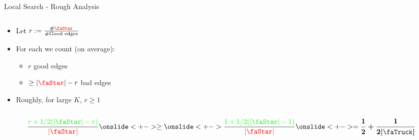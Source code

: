 \begin{frame}{Local Search - Rough Analysis}
\begin{columns}
\begin{column}{.63\textwidth}

\begin{itemize}[<+->]
\item Let $r := \frac{\#\text{\color{red}\faStar}}{\#\text{Good edges}}$ 
	\item For each {\color{red}\faStar} we count (on average):
	\begin{itemize}
	  \item $r$ good edges
	  \item $\geq |\text{\color{red}\faStar}| - r$ bad edges
	\end{itemize}
	\item Roughly, for large $K$, $r \geq 1$
\end{itemize}
\end{column}
\begin{column}{.49\textwidth}

\end{column}
\end{columns}

\onslide<+->
\vfill
$$
\frac{\color{green} r + 1/2 (|\text{\faStar}| - r)}
{\color{red} |\text{\faStar}|} 
\onslide<+->
\geq
\onslide<+->
\frac{\color{green} 1 + 1/2 (|\text{\faStar}| - 1)}
{\color{red} |\text{\faStar}|} 
\onslide<+->
=
\bm{\frac{1}{2} + \frac{1}{2 |\text{\faTruck}|}}
$$
\end{frame}